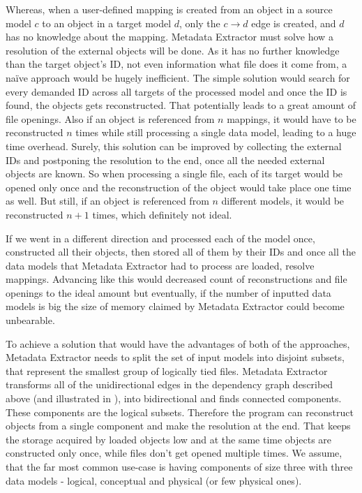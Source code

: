 Whereas, when a user-defined mapping is created from an object in a source model $c$ to an object in a target model $d$, only the $c \rightarrow d$ edge is created, and $d$ has no knowledge about the mapping.
Metadata Extractor must solve how a resolution of the external objects will be done. 
As it has no further knowledge than the target object's ID, not even information what file does it come from, a naïve approach would be hugely inefficient. 
The simple solution would search for every demanded ID across all targets of the processed model and once the ID is found, the objects gets reconstructed. 
That potentially leads to a great amount of file openings. Also if an object is referenced from $n$ mappings, it would have to be reconstructed $n$ times while still processing a single data model, leading to a huge time overhead.
Surely, this solution can be improved by collecting the external IDs and postponing the resolution to the end, once all the needed external objects are known. 
So when processing a single file, each of its target would be opened only once and the reconstruction of the object would take place one time as well. But still, if an object is referenced from $n$ different models, it would be reconstructed $n + 1$ times, which definitely not ideal.

If we went in a different direction and processed each of the model once, constructed all their objects, then stored all of them by their IDs and once all the data models that Metadata Extractor had to process are loaded, resolve mappings. 
Advancing like this would decreased count of reconstructions and file openings to the ideal amount but eventually, if the number of inputted data models is big the size of memory claimed by Metadata Extractor could become unbearable.

To achieve a solution that would have the advantages of both of the approaches, Metadata Extractor needs to split the set of input models into disjoint subsets, that represent the smallest group of logically tied files. 
Metadata Extractor transforms all of the unidirectional edges in the dependency graph described above (and illustrated in ), into bidirectional and finds connected components. These components are the logical subsets. 
Therefore the program can reconstruct objects from a single component and make the resolution at the end. That keeps the storage acquired by loaded objects low and at the same time objects are constructed only once, while files don't get opened multiple times. 
We assume, that the far most common use-case is having components of size three with three data models - logical, conceptual and physical (or few physical ones). \\

